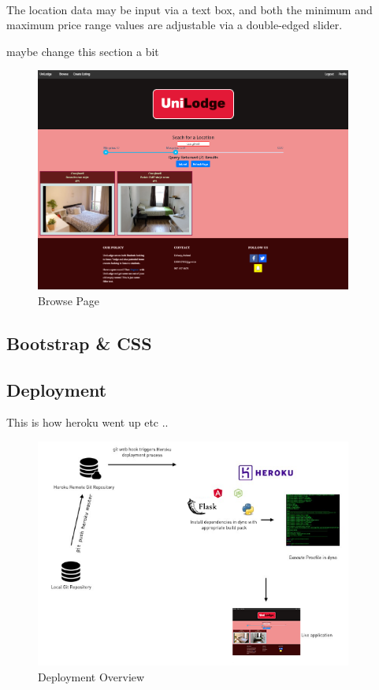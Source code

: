 \paragraph{}
The location data may be input via a text box, and both the minimum and maximum price range values are adjustable via a double-edged slider.

maybe change this section a bit

\begin{figure}[H]
	\caption{Browse Page}
	\label{image:browse}
	\centering
	\includegraphics[width=0.93\textwidth]{images/browse.png}
\end{figure}

\subsection{Bootstrap \& CSS}


\subsection{Deployment}
This is how heroku went up etc ..


\begin{figure}[H]
	\caption{Deployment Overview}
	\label{image:deploy}
	\centering
	\includegraphics[width=0.93\textwidth]{images/deploy.png}
\end{figure}